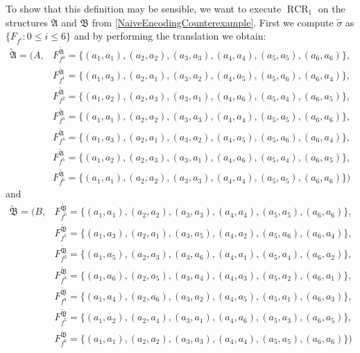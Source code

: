 \documentclass[a4paper,11pt,DIV=15]{scrartcl} %
\theoremstyle{plain}
\theoremstyle{definition}
\newcommand{\RCR}{\operatorname{RCR}}
\begin{document}
To show that this definition may be sensible, we want to execute $\RCR_1$ on the structures $\mathfrak A$ and $\mathfrak B$ from \cref{NaiveEncodingCounterexample}.
First we compute $\widetilde\sigma$ as $\{F_{f^i} : 0\leq i \leq 6\}$ and by performing the translation we obtain:
\begin{align*}
	\widetilde{\mathfrak A}=(A, 
	&F_{f^0}^{\widetilde{\mathfrak A}}=\{(a_1, a_1), (a_2, a_2),(a_3, a_3), (a_4, a_4), (a_5, a_5), (a_6, a_6)\}, \\
	&F_{f^1}^{\widetilde{\mathfrak A}}=\{(a_1, a_3), (a_2, a_1),(a_3, a_2), (a_4, a_5), (a_5, a_6), (a_6, a_4)\}, \\
	&F_{f^2}^{\widetilde{\mathfrak A}}=\{(a_1, a_2), (a_2, a_3),(a_3, a_1), (a_4, a_6), (a_5, a_4), (a_6, a_5)\}, \\
	&F_{f^3}^{\widetilde{\mathfrak A}}=\{(a_1, a_1), (a_2, a_2),(a_3, a_3), (a_4, a_4), (a_5, a_5), (a_6, a_6)\}, \\
	&F_{f^4}^{\widetilde{\mathfrak A}}=\{(a_1, a_3), (a_2, a_1),(a_3, a_2), (a_4, a_5), (a_5, a_6), (a_6, a_4)\}, \\
	&F_{f^5}^{\widetilde{\mathfrak A}}=\{(a_1, a_2), (a_2, a_3),(a_3, a_1), (a_4, a_6), (a_5, a_4), (a_6, a_5)\}, \\
	&F_{f^6}^{\widetilde{\mathfrak A}}=\{(a_1, a_1), (a_2, a_2),(a_3, a_3), (a_4, a_4), (a_5, a_5), (a_6, a_6)\})
\end{align*}
and 
\begin{align*}
	\widetilde{\mathfrak B}=(B, 
	&F_{f^0}^{\widetilde{\mathfrak B}}=\{(a_1, a_1), (a_2, a_2),(a_3, a_3), (a_4, a_4), (a_5, a_5), (a_6, a_6)\}, \\
	&F_{f^1}^{\widetilde{\mathfrak B}}=\{(a_1, a_3), (a_2, a_1),(a_3, a_5), (a_4, a_2), (a_5, a_6), (a_6, a_4)\}, \\
	&F_{f^2}^{\widetilde{\mathfrak B}}=\{(a_1, a_5), (a_2, a_3),(a_3, a_6), (a_4, a_1), (a_5, a_4), (a_6, a_2)\}, \\
	&F_{f^3}^{\widetilde{\mathfrak B}}=\{(a_1, a_6), (a_2, a_5),(a_3, a_4), (a_4, a_3), (a_5, a_2), (a_6, a_1)\}, \\
	&F_{f^4}^{\widetilde{\mathfrak B}}=\{(a_1, a_4), (a_2, a_6),(a_3, a_2), (a_4, a_5), (a_5, a_1), (a_6, a_3)\}, \\
	&F_{f^5}^{\widetilde{\mathfrak B}}=\{(a_1, a_2), (a_2, a_4),(a_3, a_1), (a_4, a_6), (a_5, a_3), (a_6, a_5)\}, \\
	&F_{f^6}^{\widetilde{\mathfrak B}}=\{(a_1, a_1), (a_2, a_2),(a_3, a_3), (a_4, a_4), (a_5, a_5), (a_6, a_6)\})
\end{align*}
\end{document}
